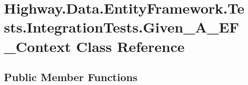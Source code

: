 \hypertarget{class_highway_1_1_data_1_1_entity_framework_1_1_tests_1_1_integration_tests_1_1_given___a___e_f___context}{\section{Highway.\-Data.\-Entity\-Framework.\-Tests.\-Integration\-Tests.\-Given\-\_\-\-A\-\_\-\-E\-F\-\_\-\-Context Class Reference}
\label{class_highway_1_1_data_1_1_entity_framework_1_1_tests_1_1_integration_tests_1_1_given___a___e_f___context}
}
\subsection*{Public Member Functions}
